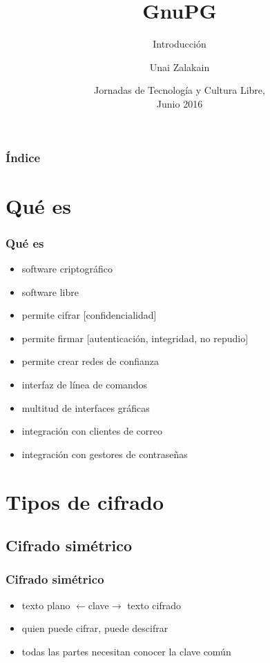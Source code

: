 \documentclass{beamer}
\title{GnuPG}
\subtitle{Introducción}
\author{Unai Zalakain}
\date{Jornadas de Tecnología y Cultura Libre,\\ Junio 2016}
\let\olditem\item
\renewcommand{\item}{%
\olditem\vspace{3pt}}
\begin{document}
\frame{\titlepage}

\begin{frame}
\frametitle{Índice}
\tableofcontents
\end{frame}


\section{Qué es}
\begin{frame}
\frametitle{Qué es}
\begin{itemize}
    \item software criptográfico
    \item software libre
    \item permite cifrar [confidencialidad]
    \item permite firmar [autenticación, integridad, no repudio]
    \item permite crear redes de confianza
    \item interfaz de línea de comandos
    \item multitud de interfaces gráficas
    \item integración con clientes de correo
    \item integración con gestores de contraseñas
\end{itemize}
\end{frame}


\section{Tipos de cifrado}
\subsection{Cifrado simétrico}
\begin{frame}
\frametitle{Cifrado simétrico}
\begin{itemize}
    \item texto plano {\tiny $\leftarrow$clave$\rightarrow$} texto cifrado
    \item quien puede cifrar, puede descifrar
    \item todas las partes necesitan conocer la clave común
\end{itemize}
\end{frame}
\end{document}
